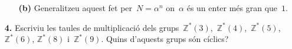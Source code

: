 \documentclass[a4paper]{article}
\theoremstyle{plain}
\theoremstyle{definition}
\newcommand{\ZZ}{\mathbb{Z}}
\begin{document}
\begin{enumerate}
    \item[]\begin{enumerate}
        \item[\textbf{(b)}] Generalitzeu aquest fet per~\(N=\alpha^{n}\)
            on~\(\alpha\) és un enter més gran que~\(1\).
    \end{enumerate}
\end{enumerate}

\begin{enumerate}
    \item[\textbf{4.}] Escriviu les taules de multiplicació dels
        grups~\(\ZZ^{\ast}(3)\),~\(\ZZ^{\ast}(4)\),~\(\ZZ^{\ast}(5)\),~\(\ZZ^{\ast}(6)\),
        \(\ZZ^{\ast}(8)\) i~\(\ZZ^{\ast}(9)\).
        Quins d'aquests grups són cíclics?
\end{enumerate}
\end{document}
